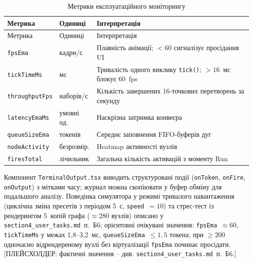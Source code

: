 \documentclass[
]{article}
\begin{document}
\begin{longtable}[]{@{}
  >{\raggedright\arraybackslash}p{}
  >{\raggedright\arraybackslash}p{}
  >{\raggedright\arraybackslash}p{}@{}}
\caption{Метрики експлуатаційного моніторингу}\tabularnewline
\toprule\noalign{}
\begin{minipage}[b]{\linewidth}\raggedright
Метрика
\end{minipage} & \begin{minipage}[b]{\linewidth}\raggedright
Одиниці
\end{minipage} & \begin{minipage}[b]{\linewidth}\raggedright
Інтерпретація
\end{minipage} \\
\midrule\noalign{}
\endfirsthead
\toprule\noalign{}
\begin{minipage}[b]{\linewidth}\raggedright
Метрика
\end{minipage} & \begin{minipage}[b]{\linewidth}\raggedright
Одиниці
\end{minipage} & \begin{minipage}[b]{\linewidth}\raggedright
Інтерпретація
\end{minipage} \\
\midrule\noalign{}
\endhead
\bottomrule\noalign{}
\endlastfoot
\texttt{fpsEma} & кадри/с & Плавність анімації; \(< 60\) сигналізує
просідання UI \\
\texttt{tickTimeMs} & мс & Тривалість одного виклику
\texttt{tick}\texttt{()}; \(> 16\)~мс блокує 60~fps \\
\texttt{throughputFps} & наборів/с & Кількість завершених 16-точкових
перетворень за секунду \\
\texttt{latencyEmaMs} & умовні од. & Наскрізна затримка конвеєра \\
\texttt{queueSizeEma} & токенів & Середнє заповнення FIFO-буферів дуг \\
\texttt{nodeActivity} & безрозмір. & Heatmap активності вузлів \\
\texttt{firesTotal} & лічильник & Загальна кількість активацій з моменту
Run \\
\end{longtable}

Компонент \texttt{TerminalOutput.tsx} виводить структуровані події
(\texttt{onToken}, \texttt{onFire}, \texttt{onOutput}) з мітками часу;
журнал можна скопіювати у буфер обміну для подальшого аналізу.
Поведінка симулятора у режимі тривалого навантаження (циклічна зміна
пресетів з періодом 5~с, \texttt{speed}~\(= 10\)) та стрес-тест із
рендерингом 5~копій графа (\(\approx 280\) вузлів) описано у
\texttt{section4\_user\_tasks.md}~п.~Б6; орієнтовні очікувані значення:
\texttt{fpsEma}~\(\approx 60\), \texttt{tickTimeMs} у межах
1{,}8--3{,}2~мс, \texttt{queueSizeEma}~\(\leq 1{,}5\) токена; при
\(\geq 200\) одночасно відрендереному вузлі без віртуалізації
\texttt{fpsEma} починає просідати. [ПЛЕЙСХОЛДЕР: фактичні значення -- див.
\texttt{section4\_user\_tasks.md}~п.~Б6.]
\end{document}
